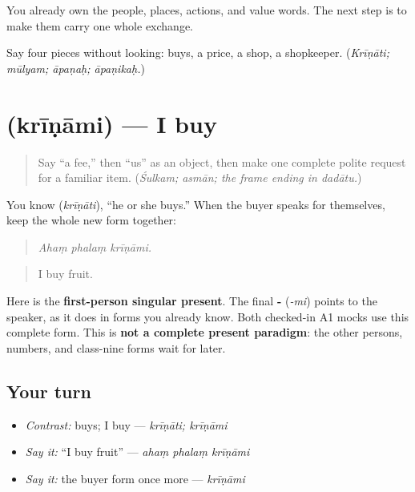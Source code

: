 \begin{grammarlens}[title={What you've built}]
You already own the people, places, actions, and value words. The next step is to make them carry one whole exchange.
\end{grammarlens}

\begin{tcolorbox}[breakable,colback=teal!4,colframe=teal!35!black,title={Before you move on}]
Say four pieces without looking: buys, a price, a shop, a shopkeeper. (\emph{Krīṇāti; mūlyam; āpaṇaḥ; āpaṇikaḥ.})
\end{tcolorbox}
\section[\texorpdfstring{\sk{क्रीणामि} (krīṇāmi)}{क्रीणामि (krīṇāmi)}]{ (krīṇāmi) — I buy}

\label{lesson:SA-C266-krinami}



\begin{quote}
Say “a fee,” then “us” as an object, then make one complete polite request for a familiar item. (\emph{Śulkam; asmān; the frame ending in dadātu.})
\end{quote}

\begin{grammarlens}[title={Grammar Lens: the buyer speaks}]
You know \textbf{} (\emph{krīṇāti}), “he or she buys.” When the buyer speaks for themselves, keep the whole new form together:

\begin{quote}
\textbf{  }
\end{quote}

\begin{quote}
\emph{Ahaṃ phalaṃ krīṇāmi.}
\end{quote}

\begin{quote}
I buy fruit.
\end{quote}

Here \textbf{} is the \textbf{first-person singular present}. The final \textbf{-} (\emph{-mi}) points to the speaker, as it does in forms you already know. Both checked-in A1 mocks use this complete form. This is \textbf{not a complete present paradigm}: the other persons, numbers, and class-nine forms wait for later.
\end{grammarlens}

\subsection*{Your turn}
\begin{itemize}
\raggedright
  \item \emph{Contrast:} buys; I buy — \emph{krīṇāti; krīṇāmi}
  \item \emph{Say it:} “I buy fruit” — \emph{ahaṃ phalaṃ krīṇāmi}
  \item \emph{Say it:} the buyer form once more — \emph{krīṇāmi}
\end{itemize}

